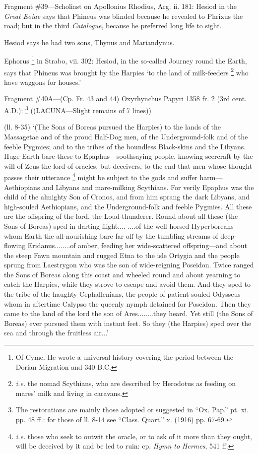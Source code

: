 Fragment \#39—Scholiast on Apollonius Rhodius, Arg. ii. 181: Hesiod in the
\emph{Great Eoiae} says that Phineus was blinded because he revealed to
Phrixus the road; but in the third \emph{Catalogue}, because he
preferred long life to sight.

Hesiod says he had two sons, Thynus and Mariandynus.

Ephorus \footnote{Of Cyme. He wrote a
universal history covering the period between the Dorian Migration and 340
B.C.} in Strabo, vii. 302: Hesiod, in
the so-called Journey round the Earth, says that Phineus was brought by the
Harpies ‘to the land of milk-feeders \footnote{\emph{i.e.} the nomad
Scythians, who are described by Herodotus as feeding on mares’ milk and
living in caravans.} who have
waggons for houses.’

Fragment \#40A—(Cp. Fr. 43 and 44) Oxyrhynchus Papyri 1358 fr. 2 (3rd
cent. A.D.): \footnote{The restorations are
mainly those adopted or suggested in “Ox. Pap.” pt. xi. pp. 48 ff.:
for those of ll. 8-14 see “Class. Quart.” x. (1916) pp. 67-69.} ((LACUNA—Slight remains of
7 lines))

(ll. 8-35) ‘(The Sons of Boreas pursued the Harpies) to the lands of the
Massagetae and of the proud Half-Dog men, of the Underground-folk and of the
feeble Pygmies; and to the tribes of the boundless Black-skins and the Libyans.
Huge Earth bare these to Epaphus—soothsaying people, knowing seercraft by
the will of Zeus the lord of oracles, but deceivers, to the end that men whose
thought passes their utterance \footnote{\emph{i.e.} those who seek
to outwit the oracle, or to ask of it more than they ought, will be deceived by
it and be led to ruin: cp. \emph{Hymn to Hermes}, 541 ff.} might be subject to the gods and
suffer harm—Aethiopians and Libyans and mare-milking Scythians. For
verily Epaphus was the child of the almighty Son of Cronos, and from him sprang
the dark Libyans, and high-souled Aethiopians, and the Underground-folk and
feeble Pygmies. All these are the offspring of the lord, the Loud-thunderer.
Round about all these (the Sons of Boreas) sped in darting flight.... ....of
the well-horsed Hyperboreans—whom Earth the all-nourishing bare far off
by the tumbling streams of deep-flowing Eridanus........of amber, feeding her
wide-scattered offspring—and about the steep Fawn mountain and rugged
Etna to the isle Ortygia and the people sprung from Laestrygon who was the son
of wide-reigning Poseidon. Twice ranged the Sons of Boreas along this coast and
wheeled round and about yearning to catch the Harpies, while they strove to
escape and avoid them. And they sped to the tribe of the haughty Cephallenians,
the people of patient-souled Odysseus whom in aftertime Calypso the queenly
nymph detained for Poseidon. Then they came to the land of the lord the son of
Ares........they heard. Yet still (the Sons of Boreas) ever pursued them with
instant feet. So they (the Harpies) sped over the sea and through the fruitless
air...’


